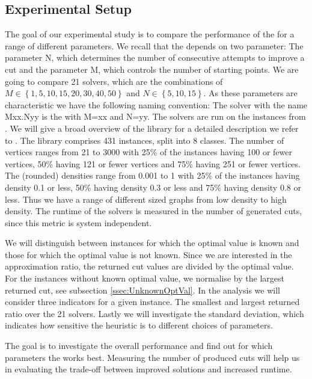 \documentclass[12pt,a4paper]{article}
\theoremstyle{mythm}
\begin{document}
\subsection{Experimental Setup} 
The goal of our experimental study is to compare the performance of the \BH for a range of different parameters.
We recall that the \BH depends on two parameter:
The parameter N, which determines the number of consecutive attempts to improve a cut and the parameter M, which controls the number of starting points.
We are going to compare 21 solvers, which are the combinations of $ M \in \left\{ 1, 5, 10, 15, 20, 30, 40, 50 \right\}  $ and $ N \in \left\{ 5, 10 , 15 \right\}  $.
As these parameters are characteristic we have the following naming convention:
The solver with the name Mxx.Nyy is the \BH with M=xx and N=yy.
The solvers are run on the instances from \MallachLibrary.
We will give a broad overview of the library for a detailed description we refer to \cite{MallachLibrary}.
The library comprises 431 instances, split into 8 classes.
The number of vertices ranges from 21 to 3000 with 25\% of the instances having 100 or fewer vertices, 50\% having 121 or fewer vertices and 75\% having 251 or fewer vertices.
The (rounded) densities range from 0.001 to 1 with 25\% of the instances having density 0.1 or less, 50\% having density 0.3 or less and 75\% having density 0.8 or less.
Thus we have a range of different sized graphs from low density to high density.
The runtime of the solvers is measured in the number of generated cuts, since this metric is system independent.

We will distinguish between instances for which the optimal value is known and those for which the optimal value is not known.
Since we are interested in the approximation ratio, the returned cut values are divided by the optimal value.
For the instances without known optimal value, we normalise by the largest returned cut, see subsection \ref{ssec:UnknownOptVal}.
In the analysis we will consider three indicators for a given instance.
The smallest and largest returned ratio over the 21 solvers.
Lastly we will investigate the standard deviation, which indicates how sensitive the heuristic is to different choices of parameters.

The goal is to investigate the overall performance and find out for which parameters the \BH works best.
Measuring the number of produced cuts will help us in evaluating the trade-off between improved solutions and increased runtime.%
\end{document}
